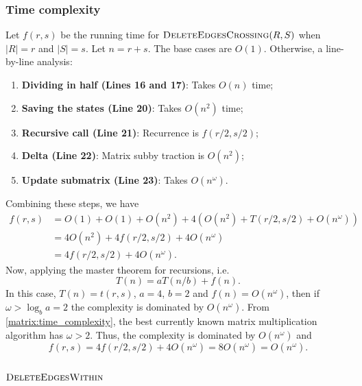 \subsubsection{Time complexity}
\noindent
Let \(f(r, s)\) be the running time for \(\textsc{DeleteEdgesCrossing}(R, S)\) when \(|R| = r\) and \(|S| = s\).
Let \(n = r + s\). The base cases are \(O(1)\).
Otherwise, a line-by-line analysis:
\begin{enumerate}
    \item \textbf{Dividing in half (Lines 16 and 17)}: Takes \(O(n)\) time;
    \item \textbf{Saving the states (Line 20)}: Takes \(O(n^2)\) time;
    \item \textbf{Recursive call (Line 21)}: Recurrence is \(f(r/2, s/2)\);
    \item \textbf{Delta (Line 22)}: Matrix subby traction is \(O(n^2)\);
    \item \textbf{Update submatrix (Line 23)}: Takes \(O(n^\omega)\).
\end{enumerate}
Combining these steps, we have
\begin{align*}
    f(r, s) &= O(1) + O(1) + O(n^2) + 4(O(n^2) + T(r / 2, s / 2) + O(n^\omega))  \\
    &= 4O(n^2) + 4f(r / 2, s / 2) + 4O(n^\omega) \\
    &= 4f(r / 2, s / 2) + 4O(n^\omega).
\end{align*}
Now, applying the master theorem for recursions, i.e. 
\[
  T(n) = aT(n/b) + f(n).
\]
In this case, \(T(n) = t(r, s)\), \(a = 4\), \(b = 2\) and \(f(n) = O(n^\omega)\), then if \(\omega > \log_{b}a = 2\) the complexity is dominated by \(O(n^\omega)\).
From \cref{matrix:time_complexity}, the best currently known matrix multiplication algorithm has \(\omega > 2\).
Thus, the complexity is dominated by \(O(n^\omega)\) and
\begin{equation}
  \label{alg:delcrossing}
  f(r, s) = 4f(r/2, s/2) + 4O(n^\omega) = 8O(n^\omega) = O(n^\omega). 
\end{equation}

\subsection{\(\textsc{DeleteEdgesWithin}\)}

